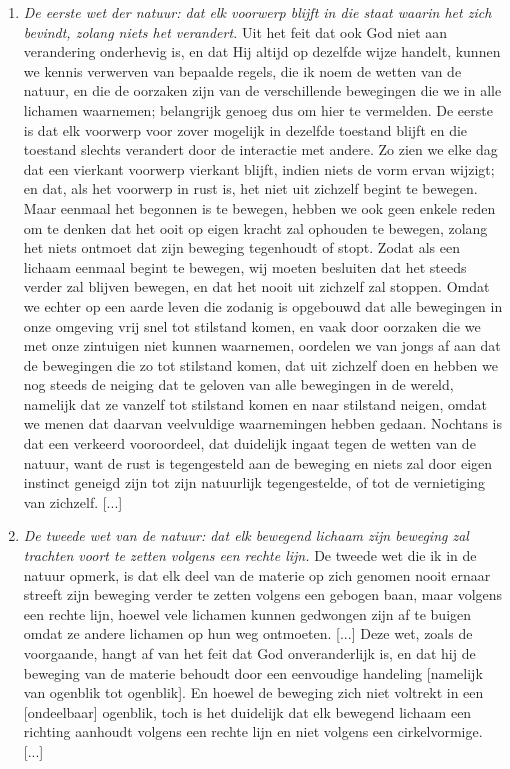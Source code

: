 {\footnotesize

\begin{enumerate}
\item[]\textit{De eerste wet der natuur: dat elk voorwerp blijft in die staat waarin het zich bevindt, zolang niets het verandert.}
Uit het feit dat ook God niet aan verandering onderhevig is, en dat Hij altijd op dezelfde wijze handelt, kunnen we kennis verwerven van bepaalde regels, die ik noem de wetten van de natuur, en die de oorzaken zijn van de verschillende bewegingen die we in alle lichamen waarnemen; belangrijk genoeg dus om hier te vermelden. De eerste is dat elk voorwerp voor zover mogelijk in dezelfde toestand blijft en die toestand slechts verandert door de interactie met andere. Zo zien we elke dag dat een vierkant voorwerp vierkant blijft, indien niets de vorm ervan wijzigt; en dat, als het voorwerp in rust is, het niet uit zichzelf begint te bewegen. Maar eenmaal het begonnen is te bewegen, hebben we ook geen enkele reden om te denken dat het ooit op eigen kracht zal ophouden te bewegen, zolang het niets ontmoet dat zijn beweging tegenhoudt of stopt. Zodat als een lichaam eenmaal begint te bewegen, wij moeten besluiten dat het steeds verder zal blijven bewegen, en dat het nooit uit zichzelf zal stoppen. Omdat we echter op een aarde leven die zodanig is opgebouwd dat alle bewegingen in onze omgeving vrij snel tot stilstand komen, en vaak door oorzaken die we met onze zintuigen niet kunnen waarnemen, oordelen we van jongs af aan dat de bewegingen die zo tot stilstand komen, dat uit zichzelf doen en hebben we nog steeds de neiging dat te geloven van alle bewegingen in de wereld, namelijk dat ze vanzelf tot stilstand komen en naar stilstand neigen, omdat we menen dat daarvan veelvuldige waarnemingen hebben gedaan. Nochtans is dat een verkeerd vooroordeel, dat duidelijk ingaat tegen de wetten van de natuur, want de rust is tegengesteld aan de beweging en niets zal door eigen instinct geneigd zijn tot zijn natuurlijk tegengestelde, of tot de vernietiging van zichzelf. [...]

\item[]\textit{De tweede wet van de natuur: dat elk bewegend lichaam zijn beweging zal trachten voort te
zetten volgens een rechte lijn.} De tweede wet die ik in de natuur opmerk, is dat elk deel van de materie op zich genomen nooit ernaar streeft zijn beweging verder te zetten volgens een gebogen baan, maar volgens een rechte lijn, hoewel vele lichamen kunnen gedwongen zijn af te buigen omdat ze andere lichamen op hun weg ontmoeten. [...] Deze wet, zoals de voorgaande, hangt af van het feit dat God onveranderlijk is, en dat hij de beweging van de materie behoudt door een eenvoudige handeling [namelijk van ogenblik tot ogenblik]. En hoewel de beweging zich niet voltrekt in een [ondeelbaar] ogenblik, toch is het duidelijk dat elk bewegend lichaam een richting aanhoudt volgens een rechte lijn en niet volgens een cirkelvormige. [...]


\end{enumerate}}
